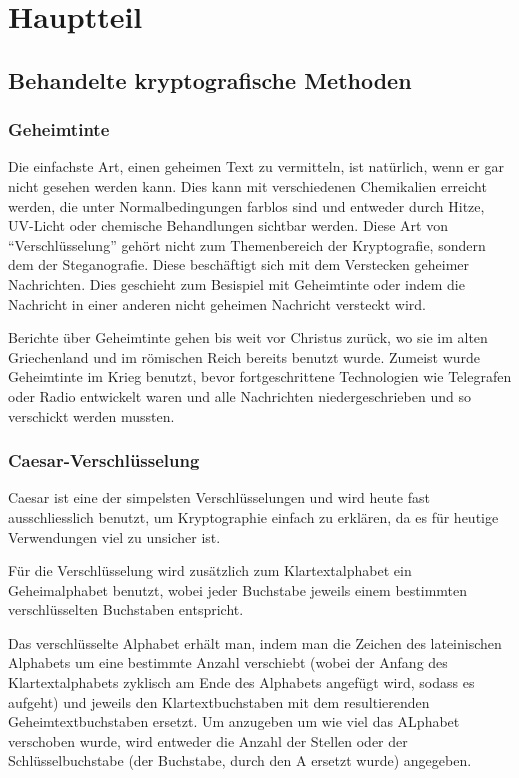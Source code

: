 \section{Hauptteil}
\label{sec:hauptteil}

\subsection{Behandelte kryptografische Methoden}

\subsubsection{Geheimtinte}

Die einfachste Art, einen geheimen Text zu vermitteln, ist natürlich, wenn er gar nicht gesehen werden kann. Dies kann mit verschiedenen Chemikalien erreicht werden, die unter Normalbedingungen farblos sind und entweder durch Hitze, UV-Licht oder chemische Behandlungen sichtbar werden. Diese Art von \enquote{Verschlüsselung} gehört nicht zum Themenbereich der Kryptografie, sondern dem der Steganografie. Diese beschäftigt sich mit dem Verstecken geheimer Nachrichten. Dies geschieht zum Besispiel mit Geheimtinte oder indem die Nachricht in einer anderen nicht geheimen Nachricht versteckt wird.

Berichte über Geheimtinte gehen bis weit vor Christus zurück, wo sie im alten Griechenland und im römischen Reich bereits benutzt wurde.
Zumeist wurde Geheimtinte im Krieg benutzt, bevor fortgeschrittene Technologien wie Telegrafen oder Radio entwickelt waren und alle Nachrichten niedergeschrieben und so verschickt werden mussten.

\newpage

\subsubsection {Caesar-Verschlüsselung}
Caesar ist eine der simpelsten Verschlüsselungen und wird heute fast ausschliesslich benutzt, um Kryptographie einfach zu erklären, da es für heutige Verwendungen viel zu unsicher ist. 

Für die Verschlüsselung wird zusätzlich zum Klartextalphabet ein Geheimalphabet benutzt, wobei jeder Buchstabe jeweils einem bestimmten verschlüsselten Buchstaben entspricht.

Das verschlüsselte Alphabet erhält man, indem man die Zeichen des lateinischen Alphabets um eine bestimmte Anzahl verschiebt (wobei der Anfang des Klartextalphabets zyklisch am Ende des Alphabets angefügt wird, sodass es aufgeht) und jeweils den Klartextbuchstaben mit dem resultierenden Geheimtextbuchstaben ersetzt. Um anzugeben um wie viel das ALphabet verschoben wurde, wird entweder die Anzahl der Stellen oder der Schlüsselbuchstabe (der Buchstabe, durch den A ersetzt wurde) angegeben. 

